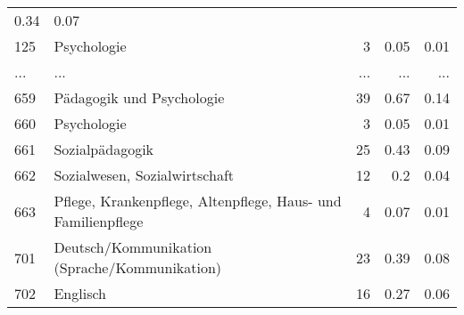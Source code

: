 \begin{longtable}{lXrrr}
          \num[round-mode=places,round-precision=2]{0,34} &
          \num[round-mode=places,round-precision=2]{0,07} \\
        125 & \multicolumn{1}{X}{Psychologie} & %
          \num{3} &
          \num[round-mode=places,round-precision=2]{0,05} &
          \num[round-mode=places,round-precision=2]{0,01} \\
       ... & ... & ... & ... & ... \\
        659 & \multicolumn{1}{X}{Pädagogik und Psychologie} & %
          \num{39} &
          \num[round-mode=places,round-precision=2]{0,67} &
          \num[round-mode=places,round-precision=2]{0,14} \\

        660 & \multicolumn{1}{X}{Psychologie} & %
          \num{3} &
          \num[round-mode=places,round-precision=2]{0,05} &
          \num[round-mode=places,round-precision=2]{0,01} \\

        661 & \multicolumn{1}{X}{Sozialpädagogik} & %
          \num{25} &
          \num[round-mode=places,round-precision=2]{0,43} &
          \num[round-mode=places,round-precision=2]{0,09} \\

        662 & \multicolumn{1}{X}{Sozialwesen, Sozialwirtschaft} & %
          \num{12} &
          \num[round-mode=places,round-precision=2]{0,2} &
          \num[round-mode=places,round-precision=2]{0,04} \\

        663 & \multicolumn{1}{X}{Pflege, Krankenpflege, Altenpflege, Haus- und Familienpflege} & %
          \num{4} &
          \num[round-mode=places,round-precision=2]{0,07} &
          \num[round-mode=places,round-precision=2]{0,01} \\

        701 & \multicolumn{1}{X}{Deutsch/Kommunikation (Sprache/Kommunikation)} & %
          \num{23} &
          \num[round-mode=places,round-precision=2]{0,39} &
          \num[round-mode=places,round-precision=2]{0,08} \\

        702 & \multicolumn{1}{X}{Englisch} & %
          \num{16} &
          \num[round-mode=places,round-precision=2]{0,27} &
          \num[round-mode=places,round-precision=2]{0,06} \\


\end{longtable}
